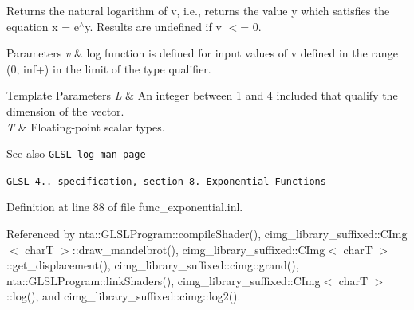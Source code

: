 Returns the natural logarithm of v, i.\+e., returns the value y which satisfies the equation x = e$^\wedge$y. Results are undefined if v $<$= 0.


\begin{DoxyParams}{Parameters}
{\em v} & log function is defined for input values of v defined in the range (0, inf+) in the limit of the type qualifier. \\
\hline
\end{DoxyParams}

\begin{DoxyTemplParams}{Template Parameters}
{\em L} & An integer between 1 and 4 included that qualify the dimension of the vector. \\
\hline
{\em T} & Floating-\/point scalar types.\\
\hline
\end{DoxyTemplParams}
\begin{DoxySeeAlso}{See also}
\href{http://www.opengl.org/sdk/docs/manglsl/xhtml/log.xml}{\tt G\+L\+SL log man page} 

\href{http://www.opengl.org/registry/doc/GLSLangSpec.4.20.8.pdf}{\tt G\+L\+SL 4.. specification, section 8. Exponential Functions} 
\end{DoxySeeAlso}


Definition at line 88 of file func\+\_\+exponential.\+inl.



Referenced by nta\+::\+G\+L\+S\+L\+Program\+::compile\+Shader(), cimg\+\_\+library\+\_\+suffixed\+::\+C\+Img$<$ char\+T $>$\+::draw\+\_\+mandelbrot(), cimg\+\_\+library\+\_\+suffixed\+::\+C\+Img$<$ char\+T $>$\+::get\+\_\+displacement(), cimg\+\_\+library\+\_\+suffixed\+::cimg\+::grand(), nta\+::\+G\+L\+S\+L\+Program\+::link\+Shaders(), cimg\+\_\+library\+\_\+suffixed\+::\+C\+Img$<$ char\+T $>$\+::log(), and cimg\+\_\+library\+\_\+suffixed\+::cimg\+::log2().

